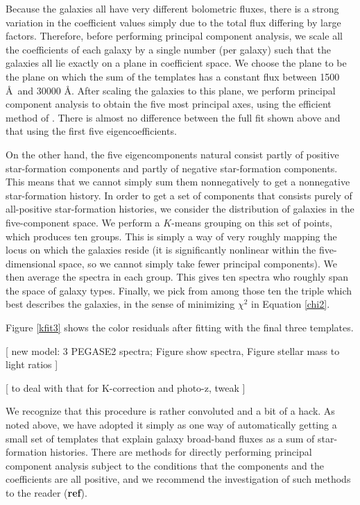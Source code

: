 \documentclass[10pt,preprint]{aastex}
\begin{document}
Because the galaxies all have very different bolometric fluxes, there
is a strong variation in the coefficient values simply due to the
total flux differing by large factors. Therefore, before performing
principal component analysis, we scale all the coefficients of each
galaxy by a single number (per galaxy) such that the galaxies all lie
exactly on a plane in coefficient space. We choose the plane to be the
plane on which the sum of the templates has a constant flux between
1500 \AA\ and 30000 \AA. After scaling the galaxies to this plane, we
perform principal component analysis to obtain the five most principal
axes, using the efficient method of \citet{roweis99a}. There is almost
no difference between the full fit shown above and that using the
first five eigencoefficients.

On the other hand, the five eigencomponents natural consist partly of
positive star-formation components and partly of negative
star-formation components. This means that we cannot simply sum them
nonnegatively to get a nonnegative star-formation history. In order to
get a set of components that consists purely of all-positive
star-formation histories, we consider the distribution of galaxies in
the five-component space. We perform a $K$-means grouping on this set
of points, which produces ten groups. This is simply a way of very
roughly mapping the locus on which the galaxies reside (it is
significantly nonlinear within the five-dimensional space, so we
cannot simply take fewer principal components). We then average the
spectra in each group. This gives ten spectra who roughly span the
space of galaxy types. Finally, we pick from among those ten the
triple which best describes the galaxies, in the sense of minimizing
$\chi^2$ in Equation \ref{chi2}. 

Figure \ref{kfit3} shows the color residuals after fitting with the
final three templates. 

[ new model: 3 PEGASE2 spectra; Figure show spectra, Figure stellar
  mass to light ratios ]

[ to deal with that for K-correction and photo-z, tweak ]
 
We recognize that this procedure is rather convoluted and a bit of a
hack. As noted above, we have adopted it simply as one way of
automatically getting a small set of templates that explain galaxy
broad-band fluxes as a sum of star-formation histories. There are
methods for directly performing principal component analysis subject
to the conditions that the components and the coefficients are all
positive, and we recommend the investigation of such methods to the
reader ({\bf ref}).
\end{document}
